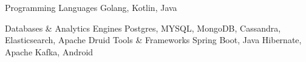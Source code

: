 

\begin{cvskills}

  \cvskill
    {Programming Languages} %
    {Golang, Kotlin, Java} %

  \cvskill
    {Databases \& Analytics Engines} %
    {Postgres, MYSQL, MongoDB, Cassandra, Elasticsearch, Apache Druid} %
  \cvskill
    {Tools \& Frameworks} %
    {Spring Boot, Java Hibernate, Apache Kafka, Android} %

\end{cvskills}
